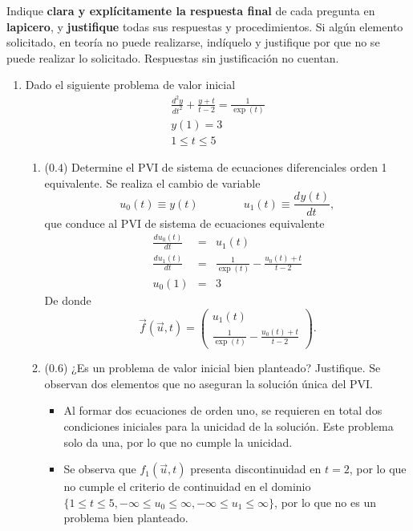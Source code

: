 \documentclass[12pt]{article}
\newcommand{\diff}[3]{\frac{d^{#3}#1}{d#2^{#3}}}
\begin{document}
Indique \textbf{clara y explícitamente la respuesta final} de cada pregunta en \textbf{lapicero}, y \textbf{justifique} todas sus respuestas y procedimientos. Si algún elemento solicitado, en teoría no puede realizarse, indíquelo y justifique por que no se puede realizar lo solicitado. Respuestas sin justificación no cuentan.
  \begin{enumerate}[leftmargin=*,widest=9]
    \item Dado el siguiente problema de valor inicial
    \[
    \begin{array}{c}
    \diff{y}{t}{2} + \frac{y+t}{t-2} = \frac{1}{\exp(t)}\\
    y(1) = 3\\
    1 \leq t \leq 5
    \end{array}
    \]
    \begin{enumerate}[label=\alph*]
    \item (\(0.4\)) Determine el PVI de sistema de ecuaciones diferenciales orden 1 equivalente.
   Se realiza el cambio de variable
   \[u_0(t) \equiv y(t) \qquad \qquad u_1(t) \equiv \diff{y(t)}{t}{}, \]
   que conduce al PVI de sistema de ecuaciones equivalente
   \begin{eqnarray*}
   \diff{u_0(t)}{t}{} &=& u_1(t)\\
   \diff{u_1(t)}{t}{} &=& \frac{1}{\exp(t)}-\frac{u_0(t)+t}{t-2}\\
   u_0(1) &=& 3
   \end{eqnarray*}
   De donde
   \[ \vec{f}(\vec{u}, t) = \begin{pmatrix}
   u_1(t) \\ \frac{1}{\exp(t)}-\frac{u_0(t)+t}{t-2}
\end{pmatrix}  .  \]
    \item (\(0.6\)) ¿Es un problema de valor inicial bien planteado? Justifique.
   Se observan dos elementos que no aseguran la solución única del PVI.
   \begin{itemize}
   \item Al formar dos ecuaciones de orden uno, se requieren en total dos condiciones iniciales para la unicidad de la solución. Este problema solo da una, por lo que no cumple la unicidad.
   \item Se observa que \(f_1(\vec{u},t)\) presenta discontinuidad en \(t= 2\), por lo que no cumple el criterio de continuidad en el dominio \(\lbrace 1 \leq t \leq 5, -\infty \leq u_0 \leq \infty, -\infty \leq u_1 \leq \infty \rbrace \), por lo que no es un problema bien planteado.

\end{itemize}
\end{enumerate}
\end{enumerate}
\end{document}
